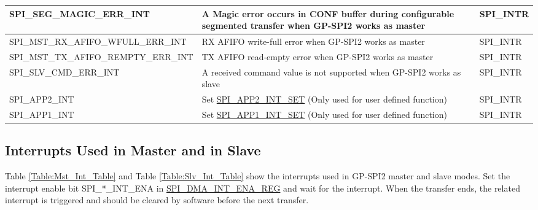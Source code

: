 \documentclass[main\_\_EN.tex]{subfiles}
\begin{document}
\begin{longtable}{ | L{6cm} | L{8.5cm} | L{2.5cm} | }
\label{int:SPISEGMAGICERRINT} SPI\_SEG\_MAGIC\_ERR\_INT & A Magic error occurs in CONF buffer during configurable segmented transfer when GP-SPI2 works as master &SPI\_INTR \\ \hline
\label{int:SPIMSTRXAFIFOWFULLERRINT} SPI\_MST\_RX\_AFIFO\_WFULL\_ERR\_INT & RX AFIFO write-full error when GP-SPI2 works as master & SPI\_INTR \\ \hline
\label{int:SPIMSTTXAFIFOREMPTYERRINT} SPI\_MST\_TX\_AFIFO\_REMPTY\_ERR\_INT &TX AFIFO read-empty error when GP-SPI2 works as master & SPI\_INTR \\ \hline
\label{int:SPISLVCMDERRINT} SPI\_SLV\_CMD\_ERR\_INT & A received command value is not supported when GP-SPI2 works as slave & SPI\_INTR \\ \hline
\label{int:SPIAPP2INT}SPI\_APP2\_INT & Set \hyperref[fielddesc:SPIAPP1INTSET]{SPI\_APP2\_INT\_SET} (Only used for user defined function)& SPI\_INTR \\ \hline
\label{int:SPIAPP1INT}SPI\_APP1\_INT & Set \hyperref[fielddesc:SPIAPP1INTSET]{SPI\_APP1\_INT\_SET} (Only used for user defined function)& SPI\_INTR \\ \hline
\end{longtable}

\subsection{Interrupts Used in Master and in Slave}

Table \ref{Table:Mst_Int_Table} and Table \ref{Table:Slv_Int_Table} show the interrupts used in GP-SPI2 master and slave modes. Set the interrupt enable bit SPI\_*\_INT\_ENA in \hyperref[regdesc:SPIDMAINTENAREG]{SPI\_DMA\_INT\_ENA\_REG} and wait for the interrupt. When the transfer ends, the related interrupt is triggered and should be cleared by software before the next transfer.
\end{document}
